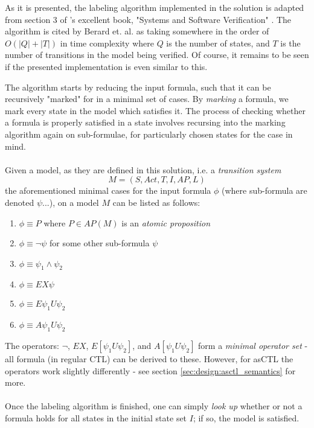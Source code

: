 \documentclass[]{article}
\begin{document}
As it is presented, the labeling algorithm implemented in the solution is adapted from section 3 of \citeauthor{Berard:2010:SSV:1965314}'s excellent book, "Systems and Software Verification" \cite{Berard:2010:SSV:1965314}. The algorithm is cited by Berard et. al. as taking somewhere in the order of $O(|Q| + |T|)$ in time complexity where $Q$ is the number of states, and $T$ is the number of transitions in the model being verified. Of course, it remains to be seen if the presented implementation is even similar to this.

The algorithm starts by reducing the input formula, such that it can be recursively "marked" for in a minimal set of cases. By \emph{marking} a formula, we mark every state in the model which satisfies it. The process of checking whether a formula is properly satisfied in a state involves recursing into the marking algorithm again on sub-formulae, for particularly chosen states for the case in mind.
\\\\
Given a model, as they are defined in this solution, i.e. a \emph{transition system} $$M = (S, Act, T, I, AP, L)$$ the aforementioned minimal cases for the input formula $\phi$ (where sub-formula are denoted $\psi$...), on a model $M$ can be listed as follows:
\begin{enumerate}
	\item $\phi \equiv P$ where $P \in AP(M)$ is an \emph{atomic proposition}
    \item $\phi \equiv \lnot \psi$ for some other sub-formula $\psi$
    \item $\phi \equiv \psi_1 \land \psi_2$
    \item\label{sec:design:minimal_ctl_next} $\phi \equiv EX\psi$
    \item\label{sec:design:minimal_ctl_e_until} $\phi \equiv E \psi_1 U \psi_2$
    \item\label{sec:design:minimal_ctl_a_until} $\phi \equiv A \psi_1 U \psi_2$
\end{enumerate}

The operators: $\lnot$, $EX$, $E[\psi_1 U \psi_2]$, and $A[\psi_1 U \psi_2]$ form a \emph{minimal operator set} - all formula (in regular CTL) can be derived to these. However, for asCTL the operators work slightly differently - see section \ref{sec:design:asctl_semantics} for more.
\\\\
Once the labeling algorithm is finished, one can simply \emph{look up} whether or not a formula holds for all states in the initial state set $I$; if so, the model is satisfied.
\end{document}
